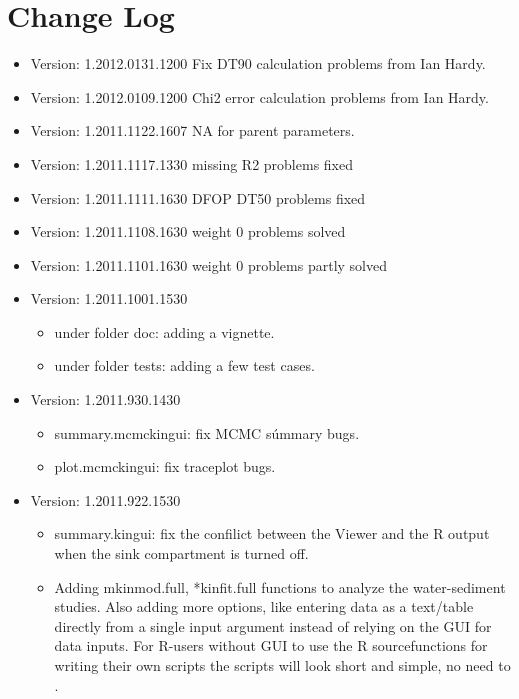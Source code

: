 \documentclass{article}
\begin{document}
\section{Change Log}
\begin{itemize}
 \item Version:  1.2012.0131.1200	Fix DT90 calculation problems
   from Ian Hardy.
 \item Version: 1.2012.0109.1200	Chi2 error calculation problems
   from Ian Hardy.
 \item Version: 1.2011.1122.1607	NA for parent parameters.
 \item Version: 1.2011.1117.1330	missing R2 problems fixed
 \item Version: 1.2011.1111.1630	DFOP DT50 problems fixed
 \item Version: 1.2011.1108.1630        weight 0 problems solved
 \item Version: 1.2011.1101.1630	weight 0 problems partly solved
  \item Version: 1.2011.1001.1530
     \begin{itemize}
    \item under folder doc: adding a vignette.
    \item under folder tests: adding a few test cases.
    \end{itemize}
  \item Version: 1.2011.930.1430
    \begin{itemize}
    \item summary.mcmckingui: fix MCMC súmmary bugs.
    \item plot.mcmckingui: fix traceplot bugs.
    \end{itemize}
  \item Version: 1.2011.922.1530
    \begin{itemize}
    \item summary.kingui: fix the confilict between the Viewer and the
      R output when the sink compartment is turned off.
    \item Adding mkinmod.full, *kinfit.full functions to analyze the
      water-sediment studies. Also adding more options, like entering
      data as a text/table directly from a single input argument
      instead of relying on the GUI for data inputs. For R-users
      without GUI to use the R sourcefunctions for writing their own scripts the
      scripts will look short and simple, no need to .
    \end{itemize}
\end{itemize}




\end{document}
